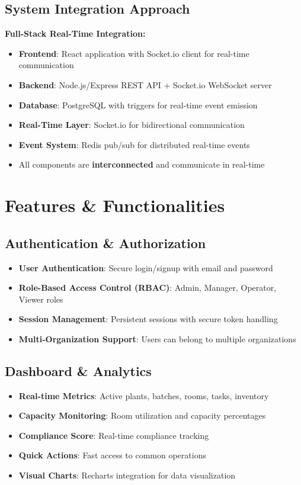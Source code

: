 \documentclass[11pt,a4paper]{article}
\begin{document}
\subsection{System Integration Approach}
\begin{realtimebox}
\textbf{Full-Stack Real-Time Integration:}
\begin{itemize}
    \item \textbf{Frontend}: React application with Socket.io client for real-time communication
    \item \textbf{Backend}: Node.js/Express REST API + Socket.io WebSocket server
    \item \textbf{Database}: PostgreSQL with triggers for real-time event emission
    \item \textbf{Real-Time Layer}: Socket.io for bidirectional communication
    \item \textbf{Event System}: Redis pub/sub for distributed real-time events
    \item All components are \textbf{interconnected} and communicate in real-time
\end{itemize}
\end{realtimebox}

\section{Features \& Functionalities}

\subsection{Authentication \& Authorization}
\begin{itemize}
    \item \textbf{User Authentication}: Secure login/signup with email and password
    \item \textbf{Role-Based Access Control (RBAC)}: Admin, Manager, Operator, Viewer roles
    \item \textbf{Session Management}: Persistent sessions with secure token handling
    \item \textbf{Multi-Organization Support}: Users can belong to multiple organizations
\end{itemize}

\subsection{Dashboard \& Analytics}
\begin{itemize}
    \item \textbf{Real-time Metrics}: Active plants, batches, rooms, tasks, inventory
    \item \textbf{Capacity Monitoring}: Room utilization and capacity percentages
    \item \textbf{Compliance Score}: Real-time compliance tracking
    \item \textbf{Quick Actions}: Fast access to common operations
    \item \textbf{Visual Charts}: Recharts integration for data visualization
\end{itemize}
\end{document}
